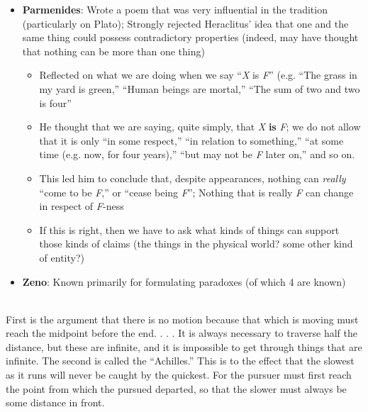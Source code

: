 \documentclass[11pt]{article}
\begin{document}
{\begin{itemize}
\begin{itemize}
\item{\textbf{Parmenides}: Wrote a poem that was very influential in the tradition (particularly on Plato); Strongly rejected Heraclitus' idea that one and the same thing could possess contradictory properties (indeed, may have thought that nothing can be more than one thing)}\begin{itemize}\item{Reflected on what we are doing when we say ``\emph{X} is \emph{F}'' (e.g. ``The grass in my yard is green,'' ``Human beings are mortal,'' ``The sum of two and two is four''}\item{He thought that we are saying, quite simply, that \emph{X} \textbf{is} \emph{F}; we do not allow that it is only ``in some respect,'' ``in relation to something,'' ``at some time (e.g. now, for four years),'' ``but may not be \emph{F} later on,'' and so on.}\item{This led him to conclude that, despite appearances, nothing can \emph{really} ``come to be \emph{F},'' or ``cease being \emph{F}''; Nothing that is really \emph{F} can change in respect of \emph{F}-ness}\item{If this is right, then we have to ask what kinds of things can support those kinds of claims (the things in the physical world? some other kind of entity?)}\end{itemize}

\item{\textbf{Zeno}: Known primarily for formulating paradoxes (of which 4 are known)}\end{itemize}\end{itemize}
\\First is the argument that there is no motion because that which is moving must reach the midpoint before the end. . . . It is always necessary to traverse half the distance, but these are infinite, and it is impossible to get through things that are infinite. The second is called the ``Achilles.'' This is to the effect that the slowest as it runs will never be caught by the quickest. For the pursuer must first reach the point from which the pursued departed, so that the slower must always be some distance in front.

}
\end{document}
